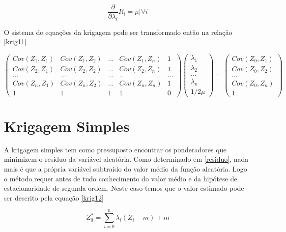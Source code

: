  \begin{equation}\label{krig10}
 \frac{\partial}{\partial \lambda_{i}}R_{i} = \mu | \forall i 
 \end{equation} 
 
 O sistema de equações da krigagem pode ser transformado então na relação \ref{krig11}
 
  \begin{equation}\label{krig11}
  \begin{pmatrix}
  Cov(Z_{1},Z_{1})&Cov(Z_{1},Z_{2})& ... & Cov(Z_{1},Z_{n})& 1\\ 
  Cov(Z_{2},Z_{1})&Cov(Z_{2},Z_{2})& ... & Cov(Z_{2},Z_{n})& 1 \\ 
  ...&...& ...&... & ...\\
  Cov(Z_{n},Z_{1})&Cov(Z_{n},Z_{2})& ... & Cov(Z_{n},Z_{n})& 1\\
  1&1& 1&1& 0
  \end{pmatrix} 
  \begin{pmatrix}
  \lambda _{1}\\ 
  \lambda _{2}\\ 
  ...\\ 
  \lambda _{n}\\
  1/2\mu
  \end{pmatrix}=\begin{pmatrix}
  Cov(Z_{0}, Z_{1})\\ 
  Cov(Z_{0}, Z_{2})\\  
  ...\\
  Cov(Z_{0}, Z_{n})\\
  1
  \end{pmatrix}
  \end{equation}

\section{Krigagem Simples}

A krigagem simples tem como pressuposto encontrar os ponderadores que minimizem o resíduo da variável aleatória. Como determinado em \ref{residuo}, nada mais é que a própria variável subtraído do valor médio da função aleatória. Logo o método requer antes de tudo conhecimento do valor médio  e da hipótese de estacionaridade de segunda ordem. Neste caso temos que o valor estimado pode ser descrito pela equação \eqref{krig12}  

 \begin{equation}\label{krig12}
 Z^*_{0} = \sum_{i=0}^{n} \lambda_{i}\left( Z_{i} - m \right) + m
 \end{equation}
 
